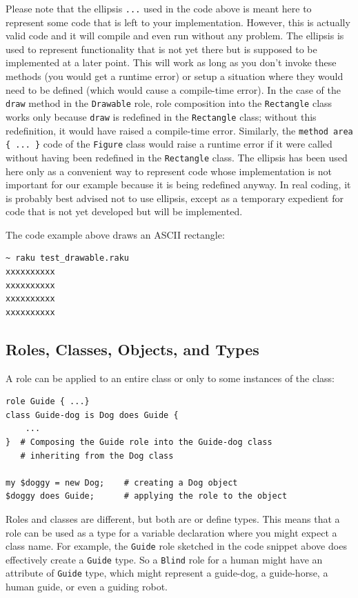 Please note that the ellipsis \verb'...' used in the code 
above is meant here to represent some code that is left 
to your implementation. However, this is actually valid code 
and it will compile and even run without any problem. The 
ellipsis is used to represent functionality that is not yet 
there but is supposed to be implemented at a later point. This 
will work as long as you don't invoke these methods (you would 
get a runtime error) or setup a situation where they would 
need to be defined (which would cause a compile-time error). 
In the case of the {\tt draw} method in the 
{\tt Drawable} role, role composition into the {\tt Rectangle} 
class works only because {\tt draw} is redefined in the 
{\tt Rectangle} class; without this redefinition, it would 
have raised a compile-time error. Similarly, 
the \verb'method area { ... }' 
code of the {\tt Figure} class would raise a runtime error if it 
were called without having been redefined in the {\tt Rectangle} 
class. The ellipsis has been used here only as a convenient way 
to represent code whose implementation is not important for 
our example because it is being redefined anyway. In real coding, 
it is probably best advised not to use ellipsis, except as a 
temporary expedient for code that is not yet developed but
will be implemented.

The code example above draws an ASCII rectangle:
\begin{verbatim}
~ raku test_drawable.raku
xxxxxxxxxx
xxxxxxxxxx
xxxxxxxxxx
xxxxxxxxxx
\end{verbatim}

\subsection{Roles, Classes, Objects, and Types}

A role can be applied to an entire class or only to some 
instances of the class:

\begin{verbatim}
role Guide { ...}
class Guide-dog is Dog does Guide { 
    ... 
}  # Composing the Guide role into the Guide-dog class
   # inheriting from the Dog class

my $doggy = new Dog;    # creating a Dog object
$doggy does Guide;      # applying the role to the object
\end{verbatim}

Roles and classes are different, but both are or define types.
This means that a role can be used as a type for a variable 
declaration where you might expect a class name. For example, 
the {\tt Guide} role sketched in the code snippet above does 
effectively create a {\tt Guide} type. So a {\tt Blind} role for 
a human might have an attribute of {\tt Guide} type, which 
might represent a guide-dog, a guide-horse, a human guide, or 
even a guiding robot.

